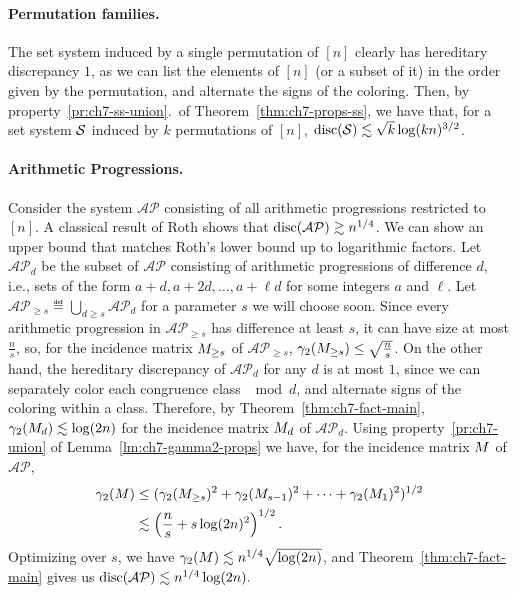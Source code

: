 \paragraph{Permutation families.} The set system induced by a single
permutation of $[n]$ clearly has hereditary discrepancy $1$, as we can list the
elements of $[n]$ (or a subset of it) in the order given by the permutation, and alternate
the signs of the coloring. Then, by property~\ref{pr:ch7-ss-union}.~of
Theorem~\ref{thm:ch7-props-ss}, we have that, for a set system $\mathcal{S}$
induced by $k$ permutations of $[n]$, $\operatorname{disc}(\mathcal{S}) \lesssim \sqrt{k} \log(kn)^{3/2}$.

\paragraph{Arithmetic Progressions.} Consider the system $\mathcal{AP}$
consisting of all arithmetic progressions restricted to $[n]$. A
classical result of Roth shows that $\operatorname{disc}(\mathcal{AP}) \gtrsim n^{1/4}$. We
can show an upper bound that matches Roth's lower bound up to
logarithmic factors. Let $\mathcal{AP}_d$ be the subset of $\mathcal{AP}$ consisting of
arithmetic progressions of difference $d$, i.e., sets of the form $a +
d, a+2d, \ldots, a + \ell d$ for some integers $a$ and $\ell$. Let
$\mathcal{AP}_{\ge s} \eqdef \bigcup_{d \ge s} \mathcal{AP}_{d}$ for a parameter $s$ we will
choose soon. Since
every arithmetic progression in $\mathcal{AP}_{\ge s}$ has difference at least
$s$, it can have size at most $\frac{n}{s}$, so, for the incidence
matrix $M_{\ge s}$ of $\mathcal{AP}_{\ge s}$, $\gamma_2(M_{\ge s}) \le
\sqrt{\frac{n}{s}}$. On the other hand, the hereditary discrepancy of
$\mathcal{AP}_d$ for any $d$ is at most $1$, since we can separately color each
congruence class $\mod d$, and alternate signs of the coloring within
a class. Therefore, by Theorem~\ref{thm:ch7-fact-main},
$\gamma_2(M_{d}) \lesssim \log(2n)$ for the incidence matrix
$M_d$ of $\mathcal{AP}_d$. Using property~\ref{pr:ch7-union} of
Lemma~\ref{lm:ch7-gamma2-props} we have, for the incidence matrix
$M$ of $\mathcal{AP}$,
\begin{align*}
  \gamma_2(M) &\le (\gamma_2(M_{\ge s})^2 +
  \gamma_2(M_{s-1})^2 + \cdots + \gamma_2(M_1)^2)^{1/2}\\
  &\lesssim \left(\frac{n}{s} + s\log(2n)^2\right)^{1/2}.
\end{align*}
Optimizing over $s$, we have $\gamma_2(M) \lesssim
n^{1/4}\sqrt{\log(2n)}$, and Theorem~\ref{thm:ch7-fact-main} gives us 
\(
\operatorname{disc}(\mathcal{AP}) \lesssim n^{1/4}\log(2n).
\)

